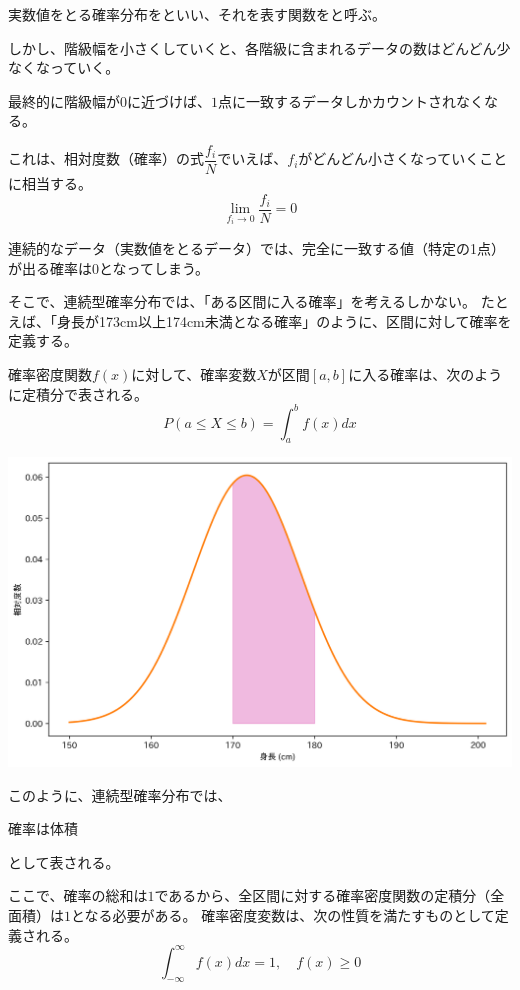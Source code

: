 \documentclass[../../../topic_statistics]{subfiles}
\begin{document}
\br

実数値をとる確率分布をといい、それを表す関数をと呼ぶ。

\br

しかし、階級幅を小さくしていくと、各階級に含まれるデータの数はどんどん少なくなっていく。

最終的に階級幅が$0$に近づけば、$1$点に一致するデータしかカウントされなくなる。

\br

これは、相対度数（確率）の式$\dfrac{f_i}{N}$でいえば、$f_i$がどんどん小さくなっていくことに相当する。
\begin{equation*}
  \lim_{f_i \to 0} \frac{f_i}{N} = 0
\end{equation*}

連続的なデータ（実数値をとるデータ）では、完全に一致する値（特定の1点）が出る確率は$0$となってしまう。

\br

そこで、連続型確率分布では、「ある区間に入る確率」を考えるしかない。
たとえば、「身長が173cm以上174cm未満となる確率」のように、区間に対して確率を定義する。

\br

確率密度関数$f(x)$に対して、確率変数$X$が区間$[a, b]$に入る確率は、次のように定積分で表される。
\begin{equation*}
  P(a \leq X \leq b) = \int_a^b f(x) dx
\end{equation*}

\br

\includegraphics[width=0.95\linewidth]{./python/sampling-height_probability.png}

\br

このように、連続型確率分布では、
\begin{emphabox}
  \begin{spacebox}
    \begin{center}
      確率は体積
    \end{center}
  \end{spacebox}
\end{emphabox}
として表される。

\br

ここで、確率の総和は$1$であるから、全区間に対する確率密度関数の定積分（全面積）は$1$となる必要がある。
確率密度変数は、次の性質を満たすものとして定義される。
\begin{equation*}
  \int_{-\infty}^{\infty} f(x) dx = 1, \quad f(x) \geq 0
\end{equation*}
\end{document}
